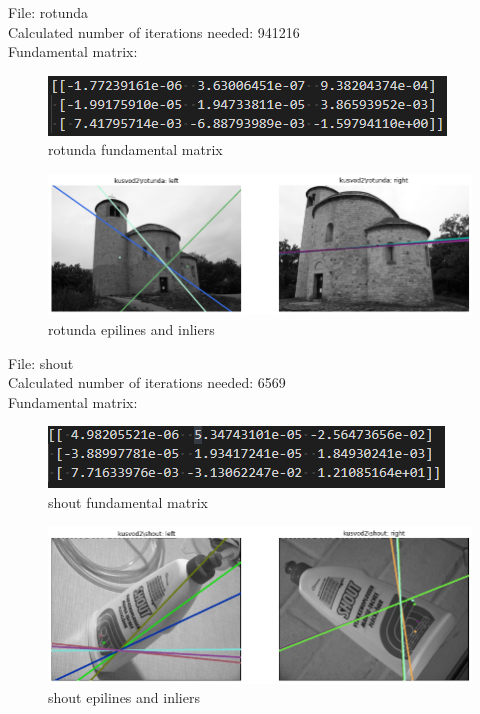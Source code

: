 \documentclass[10pt,a4paper]{article}
\begin{document}
File: rotunda\\
Calculated number of iterations needed: 941216\\
Fundamental matrix:
\begin{figure}[H]
	\centering
	\includegraphics[width=0.7\linewidth]{img/rotundaf}
	\caption{rotunda fundamental matrix}
	\label{fig:rotundaf}
\end{figure}
\begin{figure}[H]
	\centering
	\includegraphics[width=0.7\linewidth]{img/rotunda}
	\caption{rotunda epilines and inliers}
	\label{fig:rotunda}
\end{figure}

File: shout\\
Calculated number of iterations needed: 6569\\
Fundamental matrix:
\begin{figure}[H]
	\centering
	\includegraphics[width=0.7\linewidth]{img/shoutf}
	\caption{shout fundamental matrix}
	\label{fig:shoutf}
\end{figure}
\begin{figure}[H]
	\centering
	\includegraphics[width=0.7\linewidth]{img/shout}
	\caption{shout epilines and inliers}
	\label{fig:shout}
\end{figure}
\end{document}
